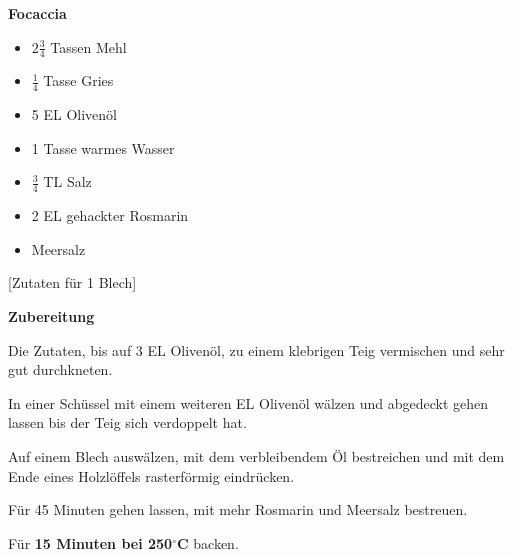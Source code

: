 

\parindent0pt	

\pagestyle{empty}


\textbf{{\LARGE Focaccia}}%

\hrulefill
\vspace*{\fill}
\begin{multicols}{2}	


\begin{itemize}
\item $2\frac{3}{4}$ Tassen Mehl
\item $\frac{1}{4}$ Tasse Gries
\item 5	EL 	Olivenöl	
\item 1 Tasse warmes Wasser
\item $\frac{3}{4}$ TL Salz
\item 2 EL gehackter Rosmarin
\item Meersalz
\end{itemize}
\end{multicols}
\vfill									%

\vspace{0.5cm}
%
\begin{center}
%
[Zutaten für 1 Blech]%
\end{center}


\vfill
\newpage
\textbf{{\LARGE Zubereitung}}%

\hrulefill

\vspace*{\fill}
\begin{multicols}{2}

Die Zutaten, bis auf 3 EL Olivenöl, zu einem klebrigen Teig vermischen und sehr gut durchkneten.\newline

In einer Schüssel mit einem weiteren EL Olivenöl wälzen und abgedeckt gehen lassen bis der Teig sich verdoppelt hat.\newline

Auf einem Blech auswälzen, mit dem verbleibendem Öl bestreichen und mit dem Ende eines Holzlöffels rasterförmig eindrücken.\newline

Für 45 Minuten gehen lassen, mit mehr Rosmarin und Meersalz bestreuen.\newline

Für \textbf{15 Minuten bei 250$^\circ$C} backen.


\end{multicols}
\vfill
